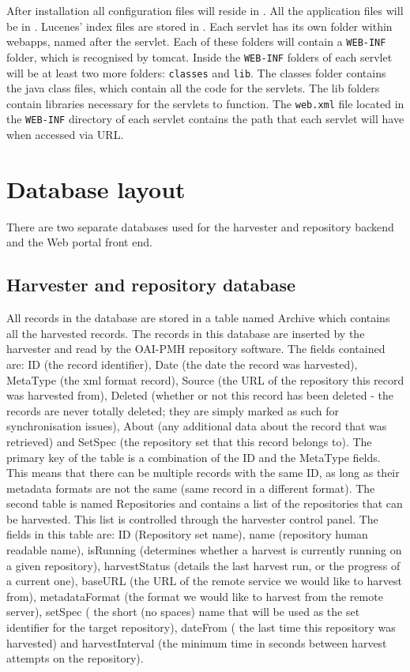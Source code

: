 \documentclass[a4paper,11pt]{article}
\begin{document}
After installation all configuration files will reside in . All the application files will be in . Lucenes' index files are stored in . Each servlet has its own folder within webapps, named after the servlet. Each of these folders will contain a \texttt{WEB-INF} folder, which is recognised by tomcat. Inside the \texttt{WEB-INF} folders of each servlet will be at least two more folders: \texttt{classes} and \texttt{lib}. The classes folder contains the java class files, which contain all the code for the servlets. The lib folders contain libraries necessary for the servlets to function. The \texttt{web.xml} file located in the \texttt{WEB-INF} directory of each servlet contains the path that each servlet will have when accessed via URL.

\section{Database layout}

There are two separate databases used for the harvester and repository backend and the Web portal front end.

\subsection{Harvester and repository database}

All records in the database are stored in a table named Archive which contains all the harvested records. The records in this database are inserted by the harvester and read by the OAI-PMH repository software. The fields contained are: ID (the record identifier), Date (the date the record was harvested), MetaType (the xml format record), Source (the URL of the repository this record was harvested from), Deleted (whether or not this record has been deleted - the records are never totally deleted; they are simply marked as such for synchronisation issues), About (any additional data about the record that was retrieved) and SetSpec (the repository set that this record belongs to).
The primary key of the table is a combination of the ID and the MetaType fields. This means that there can be multiple records with the same ID, as long as their metadata formats are not the same (same record in a different format).
The second table is named Repositories and contains a list of the repositories that can be harvested. This list is controlled through the harvester control panel. The fields in this table are: ID (Repository set name), name (repository human readable name), isRunning (determines whether a harvest is currently running on a given repository), harvestStatus (details the last harvest run, or the progress of a current one), baseURL (the URL of the remote service we would like to harvest from), metadataFormat (the format we would like to harvest from the remote server), setSpec ( the short (no spaces) name that will be used as the set identifier for the target repository), dateFrom ( the last time this repository was harvested) and harvestInterval (the minimum time in seconds between harvest attempts on the repository).
\end{document}
